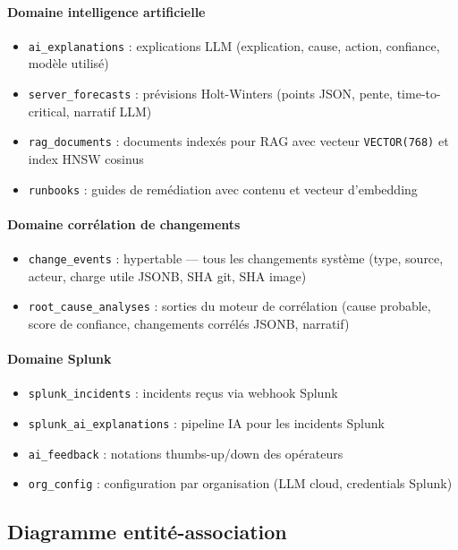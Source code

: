 \paragraph{Domaine intelligence artificielle}
\begin{itemize}
  \item \texttt{ai\_explanations} : explications LLM (explication, cause, action,
    confiance, modèle utilisé)
  \item \texttt{server\_forecasts} : prévisions Holt-Winters (points JSON, pente,
    time-to-critical, narratif LLM)
  \item \texttt{rag\_documents} : documents indexés pour RAG avec vecteur
    \texttt{VECTOR(768)} et index HNSW cosinus
  \item \texttt{runbooks} : guides de remédiation avec contenu et vecteur d'embedding
\end{itemize}

\paragraph{Domaine corrélation de changements}
\begin{itemize}
  \item \texttt{change\_events} : hypertable --- tous les changements système
    (type, source, acteur, charge utile JSONB, SHA git, SHA image)
  \item \texttt{root\_cause\_analyses} : sorties du moteur de corrélation
    (cause probable, score de confiance, changements corrélés JSONB, narratif)
\end{itemize}

\paragraph{Domaine Splunk}
\begin{itemize}
  \item \texttt{splunk\_incidents} : incidents reçus via webhook Splunk
  \item \texttt{splunk\_ai\_explanations} : pipeline IA pour les incidents Splunk
  \item \texttt{ai\_feedback} : notations thumbs-up/down des opérateurs
  \item \texttt{org\_config} : configuration par organisation (LLM cloud, credentials Splunk)
\end{itemize}

\subsection{Diagramme entité-association}

